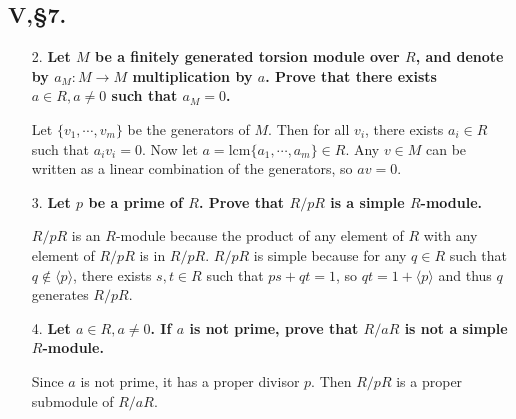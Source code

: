 \documentclass[12pt]{article}
\begin{document}
\subsection*{V,\S7.}
\begin{enumerate}
    \item[2.]
        \boldmath\textbf{Let $M$ be a finitely generated torsion module over $R$, and denote by $a_M : M\to M$ multiplication by $a$. Prove that there exists $a \in R, a \neq 0$ such that $a_M = 0$.
        }\unboldmath \par
        Let $\{ v_1, \cdots, v_m \}$ be the generators of $M$. Then for all $v_i$, there exists $a_i \in R$ such that $a_i v_i = 0$. Now let $a = \text{lcm}\{ a_1, \cdots, a_m \} \in R$. Any $v \in M$ can be written as a linear combination of the generators, so $av = 0$.

    \item[3.]
        \boldmath\textbf{Let $p$ be a prime of $R$. Prove that $R/pR$ is a simple $R$-module.
        }\unboldmath \par
        $R/pR$ is an $R$-module because the product of any element of $R$ with any element of $R/pR$ is in $R/pR$. $R/pR$ is simple because for any $q \in R$ such that $q \notin \langle p \rangle$, there exists $s, t \in R$ such that $ps + qt = 1$, so $qt = 1 + \langle p \rangle$ and thus $q$ generates $R/pR$.

    \item[4.]
        \boldmath\textbf{Let $a \in R, a \neq 0$. If $a$ is not prime, prove that $R/aR$ is not a simple $R$-module.
        }\unboldmath \par
        Since $a$ is not prime, it has a proper divisor $p$. Then $R/pR$ is a proper submodule of $R/aR$.
\end{enumerate}
\end{document}
